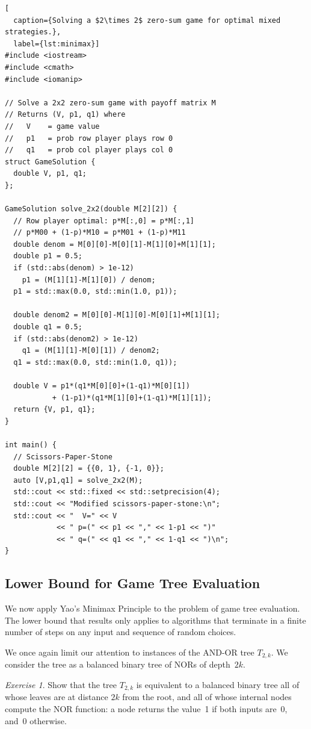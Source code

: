 \documentclass[twoside,12pt]{book}
\theoremstyle{plain}
\theoremstyle{definition}
\theoremstyle{remark}
\newtheorem{exercise}[theorem]{Exercise}
\begin{document}
\begin{lstlisting}[
  caption={Solving a $2\times 2$ zero-sum game for optimal mixed strategies.},
  label={lst:minimax}]
#include <iostream>
#include <cmath>
#include <iomanip>

// Solve a 2x2 zero-sum game with payoff matrix M
// Returns (V, p1, q1) where
//   V    = game value
//   p1   = prob row player plays row 0
//   q1   = prob col player plays col 0
struct GameSolution {
  double V, p1, q1;
};

GameSolution solve_2x2(double M[2][2]) {
  // Row player optimal: p*M[:,0] = p*M[:,1]
  // p*M00 + (1-p)*M10 = p*M01 + (1-p)*M11
  double denom = M[0][0]-M[0][1]-M[1][0]+M[1][1];
  double p1 = 0.5;
  if (std::abs(denom) > 1e-12)
    p1 = (M[1][1]-M[1][0]) / denom;
  p1 = std::max(0.0, std::min(1.0, p1));

  double denom2 = M[0][0]-M[1][0]-M[0][1]+M[1][1];
  double q1 = 0.5;
  if (std::abs(denom2) > 1e-12)
    q1 = (M[1][1]-M[0][1]) / denom2;
  q1 = std::max(0.0, std::min(1.0, q1));

  double V = p1*(q1*M[0][0]+(1-q1)*M[0][1])
           + (1-p1)*(q1*M[1][0]+(1-q1)*M[1][1]);
  return {V, p1, q1};
}

int main() {
  // Scissors-Paper-Stone
  double M[2][2] = {{0, 1}, {-1, 0}};
  auto [V,p1,q1] = solve_2x2(M);
  std::cout << std::fixed << std::setprecision(4);
  std::cout << "Modified scissors-paper-stone:\n";
  std::cout << "  V=" << V
            << " p=(" << p1 << "," << 1-p1 << ")"
            << " q=(" << q1 << "," << 1-q1 << ")\n";
}
\end{lstlisting}

\subsection{Lower Bound for Game Tree Evaluation}

We now apply Yao's Minimax Principle to the problem of game tree evaluation.
The lower bound that results only applies to algorithms that terminate in a
finite number of steps on any input and sequence of random choices.

We once again limit our attention to instances of the AND-OR tree $T_{2,k}$.
We consider the tree as a balanced binary tree of NORs of depth~$2k$.

\begin{exercise}
Show that the tree $T_{2,k}$ is equivalent to a balanced binary tree all of
whose leaves are at distance $2k$ from the root, and all of whose internal
nodes compute the NOR function: a node returns the value~1 if both inputs
are~0, and~0 otherwise.
\end{exercise}
\end{document}
